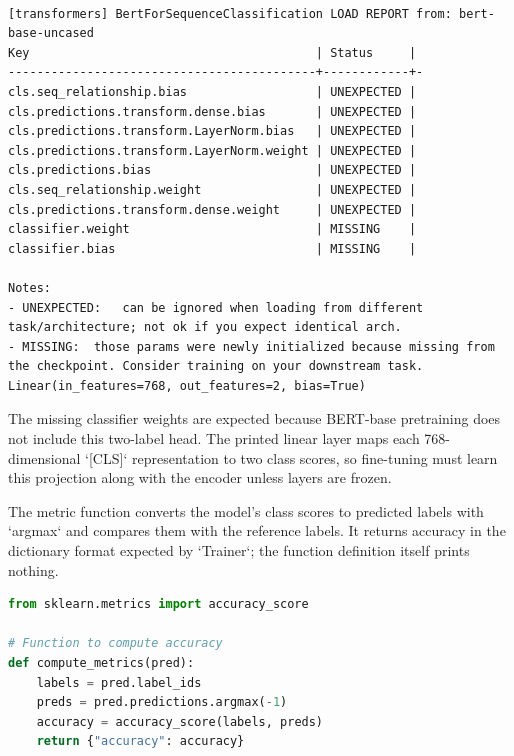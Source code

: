 \documentclass[../labs.tex]{subfiles}
\begin{document}
\begin{lstlisting}[style=terminalOutput,breakatwhitespace=false,columns=fullflexible]

[transformers] BertForSequenceClassification LOAD REPORT from: bert-base-uncased
Key                                        | Status     |
-------------------------------------------+------------+-
cls.seq_relationship.bias                  | UNEXPECTED |
cls.predictions.transform.dense.bias       | UNEXPECTED |
cls.predictions.transform.LayerNorm.bias   | UNEXPECTED |
cls.predictions.transform.LayerNorm.weight | UNEXPECTED |
cls.predictions.bias                       | UNEXPECTED |
cls.seq_relationship.weight                | UNEXPECTED |
cls.predictions.transform.dense.weight     | UNEXPECTED |
classifier.weight                          | MISSING    |
classifier.bias                            | MISSING    |

Notes:
- UNEXPECTED:	can be ignored when loading from different task/architecture; not ok if you expect identical arch.
- MISSING:	those params were newly initialized because missing from the checkpoint. Consider training on your downstream task.
Linear(in_features=768, out_features=2, bias=True)

\end{lstlisting}

The missing classifier weights are expected because BERT-base pretraining does not include this two-label head. The printed linear layer maps each 768-dimensional `[CLS]` representation to two class scores, so fine-tuning must learn this projection along with the encoder unless layers are frozen.


The metric function converts the model’s class scores to predicted labels with `argmax` and compares them with the reference labels. It returns accuracy in the dictionary format expected by `Trainer`; the function definition itself prints nothing.


\begin{lstlisting}[language=Python,basicstyle=\ttfamily\scriptsize,breaklines=true,breakatwhitespace=false,columns=fullflexible,keepspaces=true,numbers=none]
from sklearn.metrics import accuracy_score

# Function to compute accuracy
def compute_metrics(pred):
    labels = pred.label_ids
    preds = pred.predictions.argmax(-1)
    accuracy = accuracy_score(labels, preds)
    return {"accuracy": accuracy}
\end{lstlisting}
\end{document}
